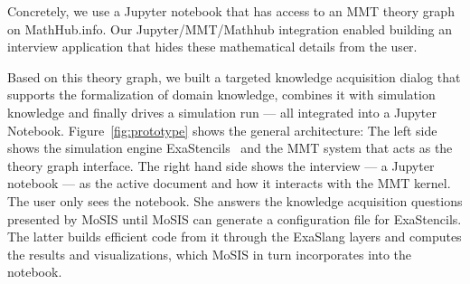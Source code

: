 Concretely, we use a Jupyter notebook that has access to an MMT theory graph on MathHub.info.  Our Jupyter/MMT/Mathhub integration enabled building an interview application that hides these mathematical details from the user.



Based on this theory graph, we built a targeted knowledge acquisition dialog that supports the formalization of domain knowledge, combines it with simulation knowledge and finally drives a simulation run --- all integrated into a Jupyter Notebook.
Figure~\ref{fig:prototype} shows the general architecture:
The left side shows the simulation engine \textsf{ExaStencils}~\cite{exastencils.on} and the MMT system that acts as the theory graph interface.
The right hand side shows the interview --- a Jupyter notebook --- as the active document and how it interacts with the MMT kernel.
The user only sees the notebook.
She answers the knowledge acquisition questions presented by MoSIS until MoSIS can generate a configuration file for ExaStencils.
The latter builds efficient code from it through the ExaSlang layers and computes the results and visualizations, which MoSIS in turn incorporates into the notebook. 


